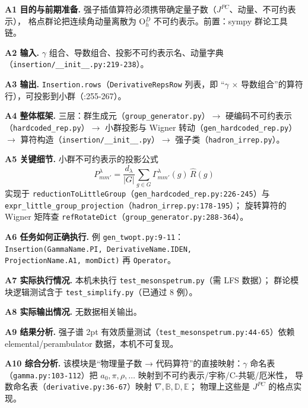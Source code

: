 \documentclass[UTF8]{ctexart}
\begin{document}
\textbf{A1 目的与前期准备.} 强子插值算符必须携带确定量子数（$J^{PC}$、动量、不可约表示），
格点群论把连续角动量离散为 O$_h^D$ 不可约表示。前置：sympy 群论工具链。

\textbf{A2 输入.} $\gamma$ 组合、导数组合、投影不可约表示名、动量字典
（\texttt{\nolinkurl{insertion/__init__.py:219-238}}）。

\textbf{A3 输出.} \texttt{\nolinkurl{Insertion.rows}}（\texttt{DerivativeRepsRow} 列表，即
``$\gamma$ $\times$ 导数组合''的算符行），可投影到小群（:255-267）。

\textbf{A4 整体框架.} 三层：群生成元（\texttt{\nolinkurl{group_generator.py}}）$\to$ 硬编码不可约表示
（\texttt{\nolinkurl{hardcoded_rep.py}}）$\to$ 小群投影与 Wigner 转动（\texttt{\nolinkurl{gen_hardcoded_rep.py}}）
$\to$ 算符构造（\texttt{\nolinkurl{insertion/__init__.py}}）$\to$ 强子类（\texttt{\nolinkurl{hadron_irrep.py}}）。

\textbf{A5 关键细节.} 小群不可约表示的投影公式
\begin{equation}\label{eq:proj}
  P^\lambda_{mm'} = \frac{d_\lambda}{|G|}\sum_{g\in G} \Gamma^\lambda_{mm'}(g)\, \hat R(g)
\end{equation}
实现于 \texttt{reductionToLittleGroup}（\texttt{\nolinkurl{gen_hardcoded_rep.py:226-245}}）与
\texttt{\nolinkurl{expr_little_group_projection}}（\texttt{\nolinkurl{hadron_irrep.py:178-195}}）；
旋转算符的 Wigner 矩阵查 \texttt{refRotateDict}（\texttt{\nolinkurl{group_generator.py:288-364}}）。

\textbf{A6 任务如何正确执行.} 例 \texttt{\nolinkurl{gen_twopt.py:9-11}}：\\
\texttt{Insertion(GammaName.PI, DerivativeName.IDEN,} \\
\texttt{ProjectionName.A1, momDict)} 再 \texttt{Operator}。

\textbf{A7 实际执行情况.} 本机未执行 \texttt{\nolinkurl{test_mesonspetrum.py}}（需 LFS 数据）；
群论模块逻辑测试含于 \texttt{\nolinkurl{test_simplify.py}}（已通过 8 例）。

\textbf{A8 实际输出情况.} 无数据相关输出。

\textbf{A9 结果分析.} 强子谱 2pt 有效质量测试（\texttt{\nolinkurl{test_mesonspetrum.py:44-65}}）依赖
elemental/perambulator 数据，本机不可复现。

\textbf{A10 综合分析.} 该模块是``物理量子数 → 代码算符''的直接映射：$\gamma$ 命名表
（\texttt{\nolinkurl{gamma.py:103-112}}）把 $a_0,\pi,\rho,\ldots$ 映射到不可约表示/宇称/C-共轭/厄米性，
导数命名表（\texttt{\nolinkurl{derivative.py:36-67}}）映射 $\nabla,\mathbb{B},\mathbb{D},\mathbb{E}$；
物理上这些是 $J^{PC}$ 的格点实现。
\end{document}
